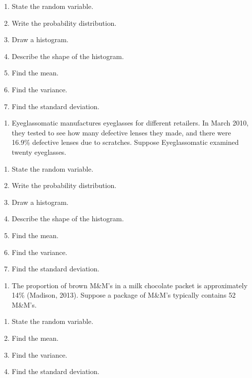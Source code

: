 \documentclass[
]{book}
\providecommand{\tightlist}{%
  \setlength{\itemsep}{0pt}\setlength{\parskip}{0pt}}
\begin{document}
\begin{enumerate}
\def\labelenumi{\alph{enumi}.}
\tightlist
\item
  State the random variable.
\item
  Write the probability distribution.
\item
  Draw a histogram.
\item
  Describe the shape of the histogram.
\item
  Find the mean.
\item
  Find the variance.
\item
  Find the standard deviation.
\end{enumerate}

\begin{enumerate}
\def\labelenumi{\arabic{enumi}.}
\setcounter{enumi}{5}
\tightlist
\item
  Eyeglassomatic manufactures eyeglasses for different retailers. In March 2010, they tested to see how many defective lenses they made, and there were 16.9\% defective lenses due to scratches. Suppose Eyeglassomatic examined twenty eyeglasses.
\end{enumerate}

\begin{enumerate}
\def\labelenumi{\alph{enumi}.}
\tightlist
\item
  State the random variable.
\item
  Write the probability distribution.
\item
  Draw a histogram.
\item
  Describe the shape of the histogram.
\item
  Find the mean.
\item
  Find the variance.
\item
  Find the standard deviation.
\end{enumerate}

\begin{enumerate}
\def\labelenumi{\arabic{enumi}.}
\setcounter{enumi}{6}
\tightlist
\item
  The proportion of brown M\&M's in a milk chocolate packet is approximately 14\% (Madison, 2013). Suppose a package of M\&M's typically contains 52 M\&M's.
\end{enumerate}

\begin{enumerate}
\def\labelenumi{\alph{enumi}.}
\tightlist
\item
  State the random variable.
\item
  Find the mean.
\item
  Find the variance.
\item
  Find the standard deviation.
\end{enumerate}
\end{document}

